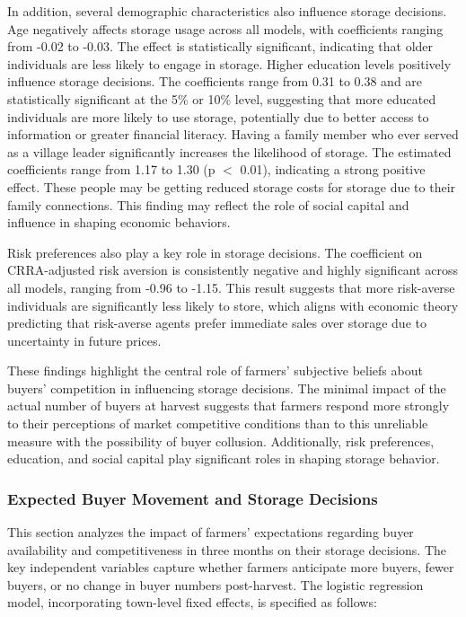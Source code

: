 \documentclass[12pt]{article}
\begin{document}
In addition, several demographic characteristics also influence storage decisions. Age negatively affects storage usage across all models, with coefficients ranging from -0.02 to -0.03. The effect is statistically significant, indicating that older individuals are less likely to engage in storage. Higher education levels positively influence storage decisions. The coefficients range from 0.31 to 0.38 and are statistically significant at the 5\% or 10\% level, suggesting that more educated individuals are more likely to use storage, potentially due to better access to information or greater financial literacy. Having a family member who ever served as a village leader significantly increases the likelihood of storage. The estimated coefficients range from 1.17 to 1.30 (p $<$ 0.01), indicating a strong positive effect. These people may be getting reduced storage costs for storage due to their family connections. This finding may reflect the role of social capital and influence in shaping economic behaviors.

Risk preferences also play a key role in storage decisions. The coefficient on CRRA-adjusted risk aversion is consistently negative and highly significant across all models, ranging from -0.96 to -1.15. This result suggests that more risk-averse individuals are significantly less likely to store, which aligns with economic theory predicting that risk-averse agents prefer immediate sales over storage due to uncertainty in future prices.

These findings highlight the central role of farmers' subjective beliefs about buyers' competition in influencing storage decisions. The minimal impact of the actual number of buyers at harvest suggests that farmers respond more strongly to their perceptions of market competitive conditions than to this unreliable measure with the possibility of buyer collusion. Additionally, risk preferences, education, and social capital play significant roles in shaping storage behavior.



\subsubsection{Expected Buyer Movement and Storage Decisions}

\noindent This section analyzes the impact of farmers' expectations regarding buyer availability and competitiveness in three months on their storage decisions. The key independent variables capture whether farmers anticipate more buyers, fewer buyers, or no change in buyer numbers post-harvest. The logistic regression model, incorporating town-level fixed effects, is specified as follows:
\end{document}
